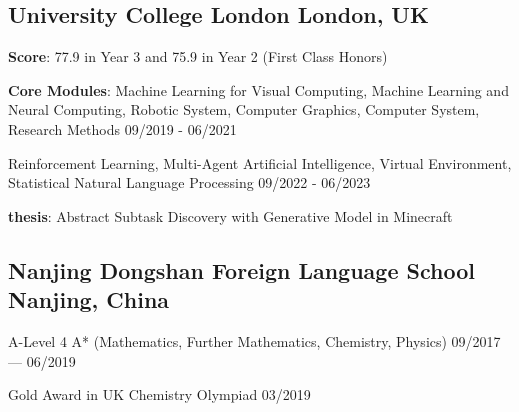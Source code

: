 
\subsection{
    University College London 
    \hfill London, UK
}
    \begin{zitemize}
        \item   \textbf{Score}: 77.9 in Year 3 and 75.9 in Year 2 (First Class Honors)
        \item   \textbf{Core Modules}: Machine Learning for Visual Computing, 
                Machine Learning and Neural Computing, 
                Robotic System, 
                Computer Graphics, 
                Computer System,
                Research Methods 
                \hfill 09/2019 - 06/2021
        \item   Reinforcement Learning,    
                Multi-Agent Artificial Intelligence,
                Virtual Environment,
                Statistical Natural Language Processing
                \hfill 09/2022 - 06/2023
        \item   \textbf{thesis}: 
                Abstract Subtask Discovery with Generative Model in Minecraft
    \end{zitemize}

\vspace{0.3em}


\subsection{
    Nanjing Dongshan Foreign Language School 
    \hfill Nanjing, China
}
    \begin{zitemize}
        \item   A-Level 4 A* (Mathematics, Further Mathematics, Chemistry, Physics) 
                \hfill 09/2017 --- 06/2019 
        \item   Gold Award in UK Chemistry Olympiad
                \hfill 03/2019
    \end{zitemize}



